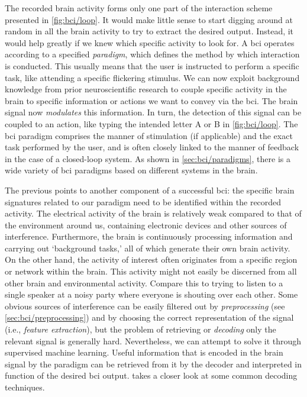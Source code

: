 The recorded brain activity forms only one part of the interaction scheme presented in
\cref{fig:bci/loop}.
It would make little sense to start digging around at random in all the brain activity
to try to extract the desired output.
Instead, it would help greatly if we knew which specific activity to look for.
A \ac{bci} operates according to a specified \emph{paradigm}, which defines the method
by which interaction is conducted.
This usually means that the user is instructed to perform a specific task, like
attending a specific flickering stimulus.
We can now exploit background knowledge from prior neuroscientific research to couple
specific activity in the brain to specific information or actions we want to convey via
the \ac{bci}.
The brain signal now \emph{modulates} this information.
In turn, the detection of this signal can be coupled to an action, like typing the
intended letter A or B in \cref{fig:bci/loop}.
The \ac{bci} paradigm comprises the manner of stimulation (if applicable) and the exact
task performed by the user, and is often closely linked to the manner of feedback in the
case of a closed-loop system.
As shown in \cref{sec:bci/paradigms}, there is a wide variety of \ac{bci} paradigms
based on different systems in the brain.

The previous points to another component of a successful \ac{bci}: the specific brain
signatures related to our paradigm need to be identified within the recorded activity.
The electrical activity of the brain is relatively weak compared to that of the
environment around us, containing electronic devices and other sources of interference.
Furthermore, the brain is continuously processing information and carrying out
`background tasks,' all of which generate their own brain activity.
On the other hand, the activity of interest often originates from a specific region or
network within the brain.
This activity might not easily be discerned from all other brain and environmental
activity.
Compare this to trying to listen to a single speaker at a noisy party where everyone is
shouting over each other.
Some obvious sources of interference can be easily filtered out by \emph{preprocessing}
(see \cref{sec:bci/preprocessing}) and by choosing the correct representation of the
signal (i.e., \emph{feature extraction}), but the problem of retrieving or
\emph{decoding} only the relevant signal is generally hard.
Nevertheless, we can attempt to solve it through supervised machine learning.
Useful information that is encoded in the brain signal by the paradigm can be retrieved
from it by the decoder and interpreted in function of the desired \ac{bci} output.
 takes a closer look at some common decoding techniques.

